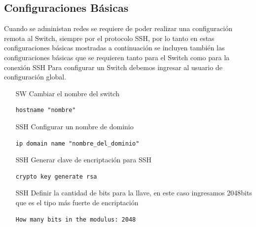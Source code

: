 \documentclass[journal]{IEEEtran}
\begin{document}
\subsection{Configuraciones Básicas}
Cuando se administan redes se requiere de poder realizar una configuración remota al Switch, siempre por el protocolo SSH, por lo tanto en estas configuraciones básicas mostradas a continuación se incluyen también las configuraciones básicas que se requieren tanto para el Switch como para la conexión SSH
Para configurar un Switch debemos ingresar al usuario de configuración global.
\begin{enumerate}
	
	\item[SW] Cambiar el nombre del switch
	\begin{lstlisting}[frame=single]
hostname "nombre"
	\end{lstlisting}
	
	\item[SSH] Configurar un nombre de dominio
	\begin{lstlisting}[frame=single]
ip domain name "nombre_del_dominio"
	\end{lstlisting}
	
	\item[SSH] Generar clave de encriptación para SSH
	\begin{lstlisting}[frame=single]
crypto key generate rsa
	\end{lstlisting}
	
	\item[SSH] Definir la cantidad de bits para la llave, en este caso ingresamos 2048bits que es el tipo más fuerte de encriptación
	\begin{lstlisting}[frame=single]
How many bits in the modulus: 2048
	\end{lstlisting}
	
	
	
\end{enumerate}
	
\end{document}
